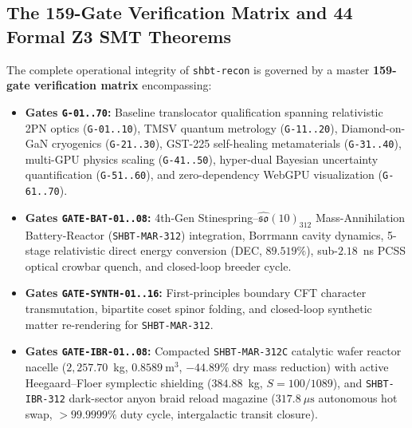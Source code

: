 \documentclass[11pt,onecolumn]{article}
\begin{document}
\FloatBarrier
\subsection{The 159-Gate Verification Matrix and 44 Formal Z3 SMT Theorems}
The complete operational integrity of \texttt{shbt-recon} is governed by a master \textbf{159-gate verification matrix} encompassing:
\begin{itemize}
    \item \textbf{Gates \texttt{G-01..70}:} Baseline translocator qualification spanning relativistic 2PN optics (\texttt{G-01..10}), TMSV quantum metrology (\texttt{G-11..20}), Diamond-on-GaN cryogenics (\texttt{G-21..30}), GST-225 self-healing metamaterials (\texttt{G-31..40}), multi-GPU physics scaling (\texttt{G-41..50}), hyper-dual Bayesian uncertainty quantification (\texttt{G-51..60}), and zero-dependency WebGPU visualization (\texttt{G-61..70}).
    \item \textbf{Gates \texttt{GATE-BAT-01..08}:} 4th-Gen Stinespring--$\widehat{\mathfrak{so}}(10)_{312}$ Mass-Annihilation Battery-Reactor (\texttt{SHBT-MAR-312}) integration, Borrmann cavity dynamics, 5-stage relativistic direct energy conversion (DEC, $89.519\%$), sub-$2.18$~ns PCSS optical crowbar quench, and closed-loop breeder cycle.
    \item \textbf{Gates \texttt{GATE-SYNTH-01..16}:} First-principles boundary CFT character transmutation, bipartite coset spinor folding, and closed-loop synthetic matter re-rendering for \texttt{SHBT-MAR-312}.
    \item \textbf{Gates \texttt{GATE-IBR-01..08}:} Compacted \texttt{SHBT-MAR-312C} catalytic wafer reactor nacelle ($2{,}257.70$~kg, $0.8589~\mathrm{m}^3$, $-44.89\%$ dry mass reduction) with active Heegaard--Floer symplectic shielding ($384.88$~kg, $S = 100/1089$), and \texttt{SHBT-IBR-312} dark-sector anyon braid reload magazine ($317.8~\mu\mathrm{s}$ autonomous hot swap, $>99.9999\%$ duty cycle, intergalactic transit closure).

\end{itemize}
\end{document}
